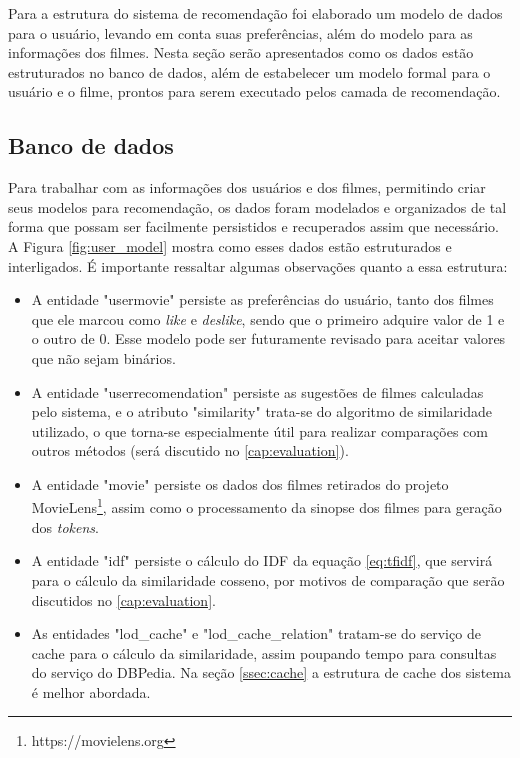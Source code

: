 Para a estrutura do sistema de recomendação foi elaborado um modelo de dados para o usuário, levando em conta suas preferências, além do modelo para as informações dos filmes. Nesta seção serão apresentados como os dados estão estruturados no banco de dados, além de estabelecer um modelo formal para o usuário e o filme, prontos para serem executado pelos camada de recomendação.

\subsection{Banco de dados}

Para trabalhar com as informações dos usuários e dos filmes, permitindo criar seus modelos para recomendação, os dados foram modelados e organizados de tal forma que possam ser facilmente persistidos e recuperados assim que necessário. A Figura \ref{fig:user_model} mostra como esses dados estão estruturados e interligados. É importante ressaltar algumas observações quanto a essa estrutura:

\begin{itemize}
	\item{A entidade "user\textunderscore movie" persiste as preferências do usuário, tanto dos filmes que ele marcou como \textit{like} e \textit{deslike}, sendo que o primeiro adquire valor de 1 e o outro de 0. Esse modelo pode ser futuramente revisado para aceitar valores que não sejam binários.}
	
	\item{A entidade "user\textunderscore recomendation" persiste as sugestões de filmes calculadas pelo sistema, e o atributo "similarity" trata-se do algoritmo de similaridade utilizado, o que torna-se especialmente útil para realizar comparações com outros métodos (será discutido no \ref{cap:evaluation}).}
	
	\item{A entidade "movie" persiste os dados dos filmes retirados do projeto MovieLens\footnote{https://movielens.org}, assim como o processamento da sinopse dos filmes para geração dos \textit{tokens}.}
	
	\item{A entidade "idf" persiste o cálculo do \ac{IDF} da equação \ref{eq:tfidf}, que servirá para o cálculo da similaridade cosseno, por motivos de comparação que serão discutidos no \ref{cap:evaluation}.}
	
	\item{As entidades "lod\_cache" e "lod\_cache\_relation" tratam-se do serviço de cache para o cálculo da similaridade, assim poupando tempo para consultas do serviço do DBPedia. Na seção \ref{ssec:cache} a estrutura de cache dos sistema é melhor abordada.}
\end{itemize}


